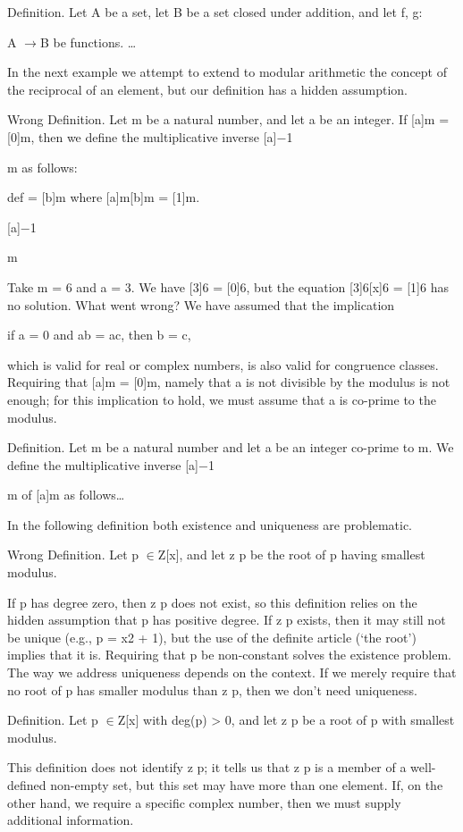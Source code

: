 \documentclass[11pt]{article}
\theoremstyle{plain}
\theoremstyle{definition}
\begin{document}
Definition. Let A be a set, let B be a set closed under addition, and let f, g:

A $\to$B be functions. \dots{}

In the next example we attempt to extend to modular arithmetic the concept of the reciprocal of an element, but our definition has a hidden assumption.

Wrong Definition. Let m be a natural number, and let a be an integer. If [a]m = [0]m, then we define the multiplicative inverse [a]$-$1

m as follows:

def = [b]m where [a]m[b]m = [1]m.

[a]$-$1

m

Take m = 6 and a = 3. We have [3]6 = [0]6, but the equation [3]6[x]6 = [1]6 has no solution. What went wrong? We have assumed that the implication

if a = 0 and ab = ac, then b = c,

which is valid for real or complex numbers, is also valid for congruence classes. Requiring that [a]m = [0]m, namely that a is not divisible by the modulus is not enough; for this implication to hold, we must assume that a is co-prime to the modulus.

Definition. Let m be a natural number and let a be an integer co-prime to m. We define the multiplicative inverse [a]$-$1

m of [a]m as follows\dots{}

In the following definition both existence and uniqueness are problematic.

Wrong Definition. Let p $\in$Z[x], and let z p be the root of p having smallest modulus.

If p has degree zero, then z p does not exist, so this definition relies on the hidden assumption that p has positive degree. If z p exists, then it may still not be unique (e.g., p = x2 + 1), but the use of the definite article (`the root') implies that it is. Requiring that p be non-constant solves the existence problem. The way we address uniqueness depends on the context. If we merely require that no root of p has smaller modulus than z p, then we don't need uniqueness.

Definition. Let p $\in$Z[x] with deg(p) > 0, and let z p be a root of p with smallest modulus.

This definition does not identify z p; it tells us that z p is a member of a well-defined non-empty set, but this set may have more than one element. If, on the other hand, we require a specific complex number, then we must supply additional information.
\end{document}
